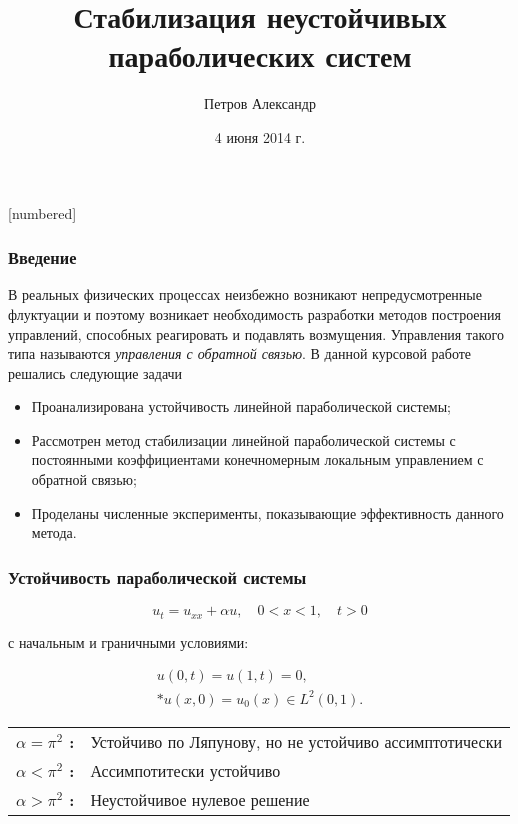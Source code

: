 \documentclass{beamer}
\title{Стабилизация неустойчивых параболических систем}
\author{Петров Александр}
\date{4 июня 2014 г.}
\begin{document}
[numbered]

\begin{frame}
\titlepage
\end{frame}


\begin{frame}
\frametitle{Введение}
\hspace{5mm} В реальных физических процессах неизбежно возникают непредусмотренные флуктуации и поэтому возникает необходимость разработки методов построения управлений, способных реагировать и подавлять возмущения. Управления такого типа называются \emph{управления с обратной связью}. В данной курсовой работе решались следующие задачи
\begin{itemize}
	\item Проанализирована устойчивость линейной параболической системы;
	\item Рассмотрен метод стабилизации линейной параболической системы с постоянными коэффициентами конечномерным локальным управлением с обратной связью; 
	\item Проделаны численные эксперименты, показывающие эффективность данного метода.
\end{itemize}
\end{frame}


\begin{frame}
\frametitle{Устойчивость параболической системы}

\begin{block}{}
\begin{equation}\label{dif_form}
u_t = u_{xx} + \alpha u, \quad 0 < x < 1, \quad t > 0
\end{equation}
\end{block}
с начальным и граничными условиями:
\begin{block}{}
\begin{gather}\label{d_control}
u(0, t) = u(1, t) = 0, \\*
u(x, 0) = u_{0}(x) \in L^2(0, 1). \nonumber
\end{gather}
\end{block}

\begin{tabular}{@{\textbullet~}l@{\ }p{3in}}
  \bfseries $\alpha = \pi^2$ : & Устойчиво по Ляпунову, но не устойчиво ассимптотически \\
  \bfseries $\alpha < \pi^2$ : & Ассимпотитески устойчиво \\
  \bfseries $\alpha > \pi^2$ : & Неустойчивое нулевое решение
\end{tabular}

\end{frame}
\end{document}
